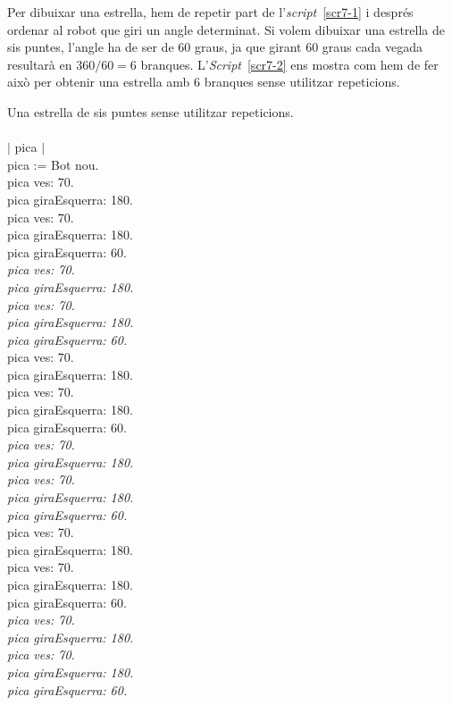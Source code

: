 Per dibuixar una estrella, hem de repetir part de l'\emph{script}~\ref{scr7-1} i després ordenar al robot que giri un angle determinat. Si volem dibuixar una estrella de sis puntes, l'angle ha de ser de 60 graus, ja que girant 60 graus cada vegada resultarà en $360/60 = 6$ branques. L'\emph{Script}~\ref{scr7-2} ens mostra com hem de fer això per obtenir una estrella amb 6 branques sense utilitzar repeticions. 

\begin{script}  Una estrella de sis puntes sense utilitzar repeticions.
\textsf{\upshape
\\
\\$|$ pica $|$\\
pica := Bot nou.\\
pica ves: 70.\\
pica giraEsquerra: 180.\\
pica ves: 70.\\
pica giraEsquerra: 180.\\
pica giraEsquerra: 60.\\
{\itshape
pica ves: 70.\\
pica giraEsquerra: 180.\\
pica ves: 70.\\
pica giraEsquerra: 180.\\
pica giraEsquerra: 60.\\
}
pica ves: 70.\\
pica giraEsquerra: 180.\\
pica ves: 70.\\
pica giraEsquerra: 180.\\
pica giraEsquerra: 60.\\
{\itshape
pica ves: 70.\\
pica giraEsquerra: 180.\\
pica ves: 70.\\
pica giraEsquerra: 180.\\
pica giraEsquerra: 60.\\
}
pica ves: 70.\\
pica giraEsquerra: 180.\\
pica ves: 70.\\
pica giraEsquerra: 180.\\
pica giraEsquerra: 60.\\
{\itshape
pica ves: 70.\\
pica giraEsquerra: 180.\\
pica ves: 70.\\
pica giraEsquerra: 180.\\
pica giraEsquerra: 60.\\
}}
\label{scr7-2}
\end{script}

